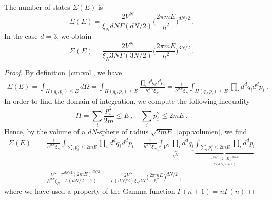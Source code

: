     The number of states $\Sigma(E)$ is 
    \begin{equation*}
        \Sigma(E) = \frac{2V^{N}}{\xi_N d N \Gamma(dN/2)} \Big ( \frac{2 \pi m E}{h^2}\Big)^{dN/2} ~.
    \end{equation*}
    In the case $d = 3$, we obtain 
    \begin{equation*}
        \Sigma(E) = \frac{2V^{N}}{\xi_N 3 N \Gamma(3N/2)} \Big ( \frac{2 \pi m E}{h^2}\Big)^{3N/2} ~.
    \end{equation*}
    \begin{proof}
        By definition~\eqref{cm:vol}, we have
        \begin{equation*}
        \begin{aligned}
            \Sigma (E) = \int_{H (q_i, p_i) \leq E} d\Omega = \int_{H (q_i, p_i) \leq E} \frac{\prod_i d^d q_i d^d p_i}{h^{dN} \xi_N} = \frac{1}{h^{dN} \xi_N} \int_{H (q_i, p_i) \leq E} \prod_i d^d q_i d^d p_i ~.
        \end{aligned}
        \end{equation*}
        In order to find the domain of integration, we compute the following inequality
        \begin{equation*}
            H = \sum_i \frac{p^2_i}{2m} \leq E ~, \quad \sum_i p^2_i \leq 2mE ~.
        \end{equation*}
        Hence, by the volume of a $dN$-sphere of radius $\sqrt{2mE}$~\eqref{app:volumen}, we find
        \begin{equation*}
        \begin{aligned}
            \Sigma (E) & = \frac{1}{h^{dN} \xi_N} \int_{\sum_i p^2_i \leq 2mE} \prod_i d^d q_i d^d p_i = \frac{1}{h^{dN} \xi_N} \underbrace{\int_{V^N} \prod_i d^d q_i}_{V^N} \underbrace{\int_{\sum_i p^2_i \leq 2mE} \prod_i d^d p_i}_{\frac{\pi^{dN/2} (2mE)^{dN/2}}{\Gamma (dN/2 + 1)}} \\ & = \frac{V^N}{h^{dN} \xi_N} \frac{\pi^{dN/2} (2mE)^{dN/2}}{\Gamma (dN/2 + 1)} = \frac{2 V^N}{\Gamma (dN/2)\xi_N d N} \Big (\frac{2 \pi m E}{h^2} \Big)^{dN/2} ~,
        \end{aligned}
        \end{equation*}
        where we have used a property of the Gamma function $\Gamma(n + 1) = n \Gamma (n)$
    \end{proof}

